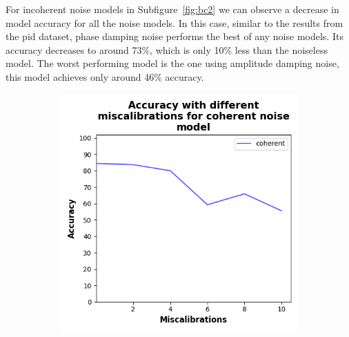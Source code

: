 For incoherent noise models in Subfigure~\ref{fig:bc2}
we can observe a decrease in model accuracy for all the noise
models. In this case, similar to the results from the \ac{pid}
dataset, phase damping noise performs the best of any noise
models. Its accuracy decreases to around 73\%, which is only
10\% less than the noiseless model. The worst performing model
is the one using amplitude damping noise, this model achieves
only around 46\% accuracy. \

\begin{figure}[!h]
  \centering

  \begin{subfigure}{0.45\textwidth}
      \includegraphics[width=\linewidth]{figures/evaluation_results/breast-cancer/pqc/figures/accuracy-coherent.png}
      \label{fig:bc1}
  \end{subfigure} \qquad
  \begin{subfigure}{0.45\textwidth}

\end{subfigure}
\end{figure}
